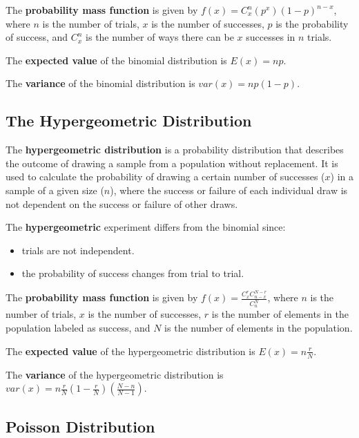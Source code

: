 \documentclass[
  letterpaper,
  DIV=11,
  numbers=noendperiod]{scrreprt}
\begin{document}
The \textbf{probability mass function} is given by
\(f(x)=C_x^n (p^x)(1-p)^{n-x}\), where \(n\) is the number of trials,
\(x\) is the number of successes, \(p\) is the probability of success,
and \(C_x^n\) is the number of ways there can be \(x\) successes in
\(n\) trials.

The \textbf{expected value} of the binomial distribution is \(E(x)=np\).

The \textbf{variance} of the binomial distribution is
\(var(x)=np(1-p)\).

\hypertarget{the-hypergeometric-distribution}{%
\subsection*{The Hypergeometric
Distribution}\label{the-hypergeometric-distribution}}

The \textbf{hypergeometric distribution} is a probability distribution
that describes the outcome of drawing a sample from a population without
replacement. It is used to calculate the probability of drawing a
certain number of successes (\(x\)) in a sample of a given size (\(n\)),
where the success or failure of each individual draw is not dependent on
the success or failure of other draws.

The \textbf{hypergeometric} experiment differs from the binomial since:

\begin{itemize}
\item
  trials are not independent.
\item
  the probability of success changes from trial to trial.
\end{itemize}

The \textbf{probability mass function} is given by
\(f(x)=\frac {C_x^r C_{n-x}^{N-r}}{C_n^N}\), where \(n\) is the number
of trials, \(x\) is the number of successes, \(r\) is the number of
elements in the population labeled as success, and \(N\) is the number
of elements in the population.

The \textbf{expected value} of the hypergeometric distribution is
\(E(x)=n \frac {r}{N}\).

The \textbf{variance} of the hypergeometric distribution is
\(var(x)= n \frac {r}{N} (1- \frac {r}{N}) (\frac {N-n}{N-1})\).

\hypertarget{poisson-distribution}{%
\subsection*{Poisson Distribution}\label{poisson-distribution}}
\end{document}
